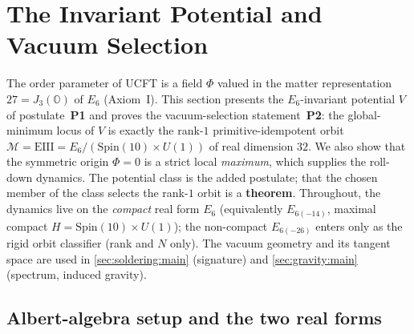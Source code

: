 \documentclass[11pt]{article}
\theoremstyle{plain}
\theoremstyle{definition}
\theoremstyle{remark}
\begin{document}
\section{The Invariant Potential and Vacuum Selection}
\label{sec:potential:main}
\label{sec:pot:main}
\label{sec:vacuum}

The order parameter of UCFT is a field $\Phi$ valued in the matter representation
$27=J_3(\mathbb O)$ of $E_6$ (Axiom~I). This section presents the $E_6$-invariant potential
$V$ of postulate~\textbf{P1} and proves the vacuum-selection statement~\textbf{P2}: the
global-minimum locus of $V$ is exactly the rank-$1$ primitive-idempotent orbit
$\mathcal M=\mathrm{EIII}=E_6/(\mathrm{Spin}(10)\times U(1))$ of real dimension $32$. We also
show that the symmetric origin $\Phi=0$ is a strict local \emph{maximum}, which supplies the
roll-down dynamics. The potential class is the added postulate; that the chosen member of the
class selects the rank-$1$ orbit is a \textbf{theorem}. Throughout, the dynamics live on the
\emph{compact} real form $E_6$ (equivalently $E_{6(-14)}$, maximal compact
$H=\mathrm{Spin}(10)\times U(1)$); the non-compact $E_{6(-26)}$ enters only as the rigid
orbit classifier (rank and $N$ only). The vacuum geometry and its tangent space are used in
\autoref{sec:soldering:main} (signature) and \autoref{sec:gravity:main} (spectrum, induced
gravity).

\subsection{Albert-algebra setup and the two real forms}
\label{sec:potential:setup}
\end{document}
